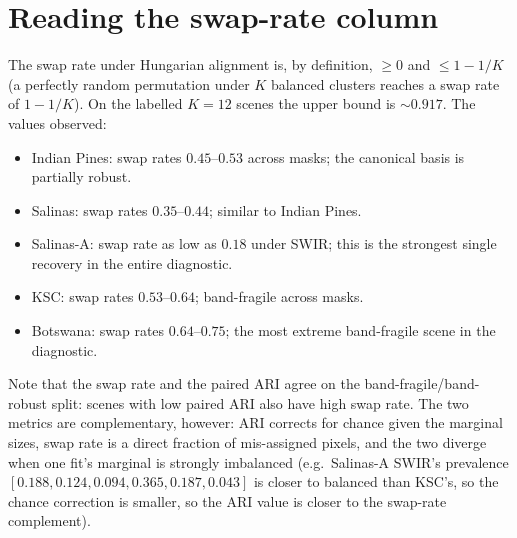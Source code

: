\documentclass[11pt,a4paper]{article}
\begin{document}
\section{Reading the swap-rate column}

The swap rate under Hungarian alignment is, by definition,
$\ge 0$ and $\le 1 - 1/K$ (a perfectly random permutation under $K$
balanced clusters reaches a swap rate of $1 - 1/K$). On the labelled
$K=12$ scenes the upper bound is $\sim 0.917$. The values observed:

\begin{itemize}
\item Indian Pines: swap rates $0.45$--$0.53$ across masks; the
canonical basis is partially robust.
\item Salinas: swap rates $0.35$--$0.44$; similar to Indian Pines.
\item Salinas-A: swap rate as low as $0.18$ under SWIR; this is the
strongest single recovery in the entire diagnostic.
\item KSC: swap rates $0.53$--$0.64$; band-fragile across masks.
\item Botswana: swap rates $0.64$--$0.75$; the most extreme
band-fragile scene in the diagnostic.
\end{itemize}

Note that the swap rate and the paired ARI agree on the
band-fragile/band-robust split: scenes with low paired ARI also have
high swap rate. The two metrics are complementary, however:
ARI corrects for chance given the marginal sizes, swap rate is a
direct fraction of mis-assigned pixels, and the two diverge when one
fit's marginal is strongly imbalanced (e.g.\ Salinas-A SWIR's
prevalence $[0.188, 0.124, 0.094, 0.365, 0.187, 0.043]$ is closer
to balanced than KSC's, so the chance correction is smaller, so the
ARI value is closer to the swap-rate complement).



\end{document}
